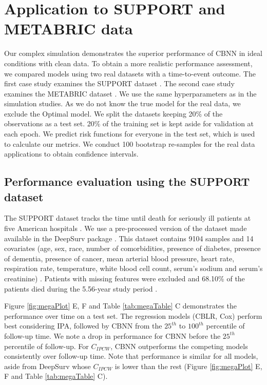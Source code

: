 \documentclass[AMA,STIX1COL,]{WileyNJD-v2}
\begin{document}
\hypertarget{casestudies}{%
\section{Application to SUPPORT and METABRIC data}\label{casestudies}}

Our complex simulation demonstrates the superior performance of CBNN in
ideal conditions with clean data. To obtain a more realistic performance
assessment, we compared models using two real datasets with a
time-to-event outcome. The first case study examines the SUPPORT dataset
\citep{knaus1995SUPPORT}. The second case study examines the METABRIC
dataset \citep{curtis2012genomic}. We use the same hyperparameters as in
the simulation studies. As we do not know the true model for the real
data, we exclude the Optimal model. We split the datasets keeping 20\%
of the observations as a test set. 20\% of the training set is kept
aside for validation at each epoch. We predict risk functions for
everyone in the test set, which is used to calculate our metrics. We
conduct 100 bootstrap re-samples for the real data applications to
obtain confidence intervals.

\hypertarget{performance-evaluation-using-the-support-dataset}{%
\subsection{Performance evaluation using the SUPPORT
dataset}\label{performance-evaluation-using-the-support-dataset}}

The SUPPORT dataset tracks the time until death for seriously ill
patients at five American hospitals \citep{knaus1995SUPPORT}. We use a
pre-processed version of the dataset made available in the DeepSurv
package \citep{katzman2018DeepSurv}. This dataset contains 9104 samples
and 14 covariates (age, sex, race, number of comorbidities, presence of
diabetes, presence of dementia, presence of cancer, mean arterial blood
pressure, heart rate, respiration rate, temperature, white blood cell
count, serum's sodium and serum's creatinine)
\citep{katzman2018DeepSurv}. Patients with missing features were
excluded and 68.10\% of the patients died during the 5.56-year study
period \citep{katzman2018DeepSurv}.

Figure \ref{fig:megaPlot} E, F and Table \ref{tab:megaTable} C
demonstrates the performance over time on a test set. The regression
models (CBLR, Cox) perform best considering IPA, followed by CBNN from
the \(25^{th}\) to \(100^{th}\) percentile of follow-up time. We note a
drop in performance for CBNN before the \(25^{th}\) percentile of
follow-up. For \(C_{IPCW}\), CBNN outperforms the competing models
consistently over follow-up time. Note that performance is similar for
all models, aside from DeepSurv whose \(C_{IPCW}\) is lower than the
rest (Figure \ref{fig:megaPlot} E, F and Table \ref{tab:megaTable} C).
\end{document}
